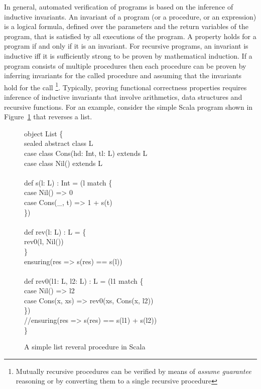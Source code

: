 In general, automated verification of programs is based on the inference of inductive invariants.
An invariant of a program (or a procedure, or an expression) is a logical formula, defined over the 
parameters and the return variables of the program, that is satisfied by all executions of the program. 
A property holds for a program if and only if it is an invariant. 
For recursive programs, an invariant is inductive iff it is sufficiently strong to be 
proven by mathematical induction. 
If a program consists of multiple procedures then each procedure can be proven by inferring invariants
for the called procedure and assuming that the invariants hold for the call 
\footnote{Mutually recursive procedures can be 
verified by means of \emph{assume guarantee} reasoning or by converting them 
to a single recursive procedure}.
Typically, proving functional correctness properties requires inference of inductive invariants
that involve arithmetics, data structures and recursive functions. 
For an example, consider the simple Scala program shown in Figure~\ref{fig:eg} that reverses a list. 
%
\begin{figure}
\begin{myprogram}
object List \{ \\
\pnl \>    sealed abstract class L \\
\pnl \>    case class Cons(hd: Int, tl: L) extends L \\
\pnl \>    case class Nil() extends L \\
\\
\pnl \>    def s(l: L) : Int = (l match \{ \\
\pnl \> \>      case Nil() => 0 \\
\pnl \> \>      case Cons(\_, t) => 1 + s(t) \\
\pnl \>    \}) \\
\\
\pnl \>    def rev(l: L) : L = \{ \\
\pnl \> \>      rev0(l, Nil())  \\
\pnl \>    \} \\
\pnl \>    ensuring(res => s(res) == s(l))\\
\\    
\pnl \>    def rev0(l1: L, l2: L) : L = (l1 match \{ \\
\pnl \> \>      case Nil() => l2 \\
\pnl \> \>     case Cons(x, xs) => rev0(xs, Cons(x, l2)) \\
\pnl \>    \}) \\ 
\pnl \>    //ensuring(res => s(res) == s(l1) + s(l2)) \\
\}
\end{myprogram}
\caption{A simple list reveral procedure in Scala} \label{fig:eg}
\end{figure}
